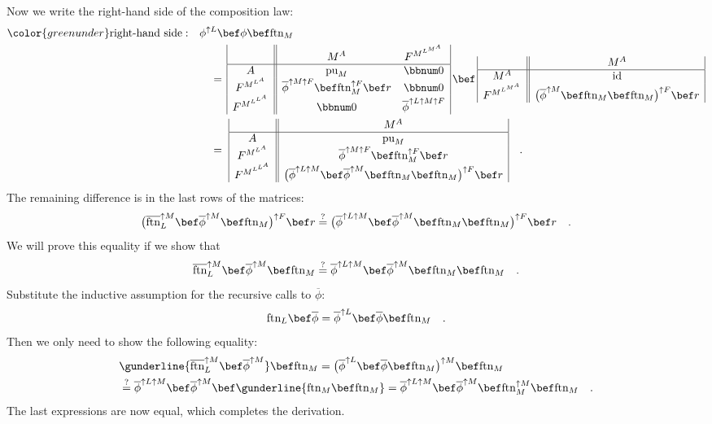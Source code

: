 Now we write the right-hand side of the composition law:
\begin{align*}
{\color{greenunder}\text{right-hand side}:}\quad & \phi^{\uparrow L}\bef\phi\bef\text{ftn}_{M}\\
 & \quad=\,\begin{array}{|c||cc|}
 & M^{A} & F^{M^{L^{M^{A}}}}\\
\hline A & \text{pu}_{M} & \bbnum 0\\
F^{M^{L^{A}}} & \overline{\phi}^{\uparrow M\uparrow F}\bef\text{ftn}_{M}^{\uparrow F}\bef r & \bbnum 0\\
F^{M^{L^{L^{A}}}} & \bbnum 0 & \overline{\phi}^{\uparrow L\uparrow M\uparrow F}
\end{array}\,\bef\,\begin{array}{|c||c|}
 & M^{A}\\
\hline M^{A} & \text{id}\\
F^{M^{L^{M^{A}}}} & \big(\overline{\phi}^{\uparrow M}\bef\text{ftn}_{M}\bef\text{ftn}_{M}\big)^{\uparrow F}\bef r
\end{array}\\
 & \quad=\,\,\begin{array}{|c||c|}
 & M^{A}\\
\hline A & \text{pu}_{M}\\
F^{M^{L^{A}}} & \overline{\phi}^{\uparrow M\uparrow F}\bef\text{ftn}_{M}^{\uparrow F}\bef r\\
F^{M^{L^{L^{A}}}} & \big(\overline{\phi}^{\uparrow L\uparrow M}\bef\overline{\phi}^{\uparrow M}\bef\text{ftn}_{M}\bef\text{ftn}_{M}\big)^{\uparrow F}\bef r
\end{array}\quad.
\end{align*}
The remaining difference is in the last rows of the matrices:
\[
\big(\overline{\text{ftn}}_{L}^{\uparrow M}\bef\overline{\phi}^{\uparrow M}\bef\text{ftn}_{M}\big)^{\uparrow F}\bef r\overset{?}{=}\big(\overline{\phi}^{\uparrow L\uparrow M}\bef\overline{\phi}^{\uparrow M}\bef\text{ftn}_{M}\bef\text{ftn}_{M}\big)^{\uparrow F}\bef r\quad.
\]
We will prove this equality if we show that
\[
\overline{\text{ftn}}_{L}^{\uparrow M}\bef\overline{\phi}^{\uparrow M}\bef\text{ftn}_{M}\overset{?}{=}\overline{\phi}^{\uparrow L\uparrow M}\bef\overline{\phi}^{\uparrow M}\bef\text{ftn}_{M}\bef\text{ftn}_{M}\quad.
\]
Substitute the inductive assumption for the recursive calls to $\overline{\phi}$:
\[
\text{ftn}_{L}\bef\overline{\phi}=\overline{\phi}^{\uparrow L}\bef\overline{\phi}\bef\text{ftn}_{M}\quad.
\]
Then we only need to show the following equality:
\begin{align*}
 & \gunderline{\overline{\text{ftn}}_{L}^{\uparrow M}\bef\overline{\phi}^{\uparrow M}}\bef\text{ftn}_{M}=\big(\overline{\phi}^{\uparrow L}\bef\overline{\phi}\bef\text{ftn}_{M}\big)^{\uparrow M}\bef\text{ftn}_{M}\\
 & \overset{?}{=}\overline{\phi}^{\uparrow L\uparrow M}\bef\overline{\phi}^{\uparrow M}\bef\gunderline{\text{ftn}_{M}\bef\text{ftn}_{M}}=\overline{\phi}^{\uparrow L\uparrow M}\bef\overline{\phi}^{\uparrow M}\bef\text{ftn}_{M}^{\uparrow M}\bef\text{ftn}_{M}\quad.
\end{align*}
The last expressions are now equal, which completes the derivation.

